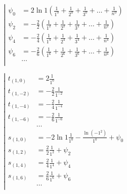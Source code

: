 \begin{equation*} \left| \begin{aligned}
\psi_0 &= 2 \ln{1}
  \left(
  \frac{1}{1^0}
+ \frac{1}{2^0}
+ \frac{1}{3^0}
+ \ldots
+ \frac{1}{n^0}
  \right) \\
%
\psi_2 &=
- \frac{2}{2}
  \left(
  \frac{1}{1^2}
+ \frac{1}{2^2}
+ \frac{1}{3^2}
+ \ldots
+ \frac{1}{n^2}
  \right) \\
%
\psi_4 &=
- \frac{2}{4}
  \left(
  \frac{1}{1^4}
+ \frac{1}{2^4}
+ \frac{1}{3^4}
+ \ldots
+ \frac{1}{n^4}
  \right) \\
%
\psi_6 &=
- \frac{2}{6}
  \left(
  \frac{1}{1^6}
+ \frac{1}{2^6}
+ \frac{1}{3^6}
+ \ldots
+ \frac{1}{n^6}
  \right) \\
%
&\ldots \\
\end{aligned} \right. \end{equation*}

\begin{equation*} \left| \begin{aligned}
t_{(1,0)} &=
  2 \frac{1}{1^0} \\
%
t_{(1,-2)} &=
- \frac{2}{2}
  \frac{1}{1^{-2}} \\
%
t_{(1,-4)} &=
- \frac{2}{4}
  \frac{1}{1^{-4}} \\
%
t_{(1,-6)} &=
- \frac{2}{6}
  \frac{1}{1^{-6}} \\
&\ldots \\
%
s_{(1,0)} &=
- 2 \ln{1}
  \frac{1}{1^0}
- \frac{\ln{(- 1^2)}}{1^0}
+ \psi_0 \\
%
s_{(1,2)} &=
  \frac{2}{2}
  \frac{1}{1^2}
+ \psi_2 \\
%
s_{(1,4)} &=
  \frac{2}{4}
  \frac{1}{1^4}
+ \psi_4 \\
%
s_{(1,6)} &=
  \frac{2}{6}
  \frac{1}{1^6}
+ \psi_6 \\
%
&\ldots \\
\end{aligned} \right. \end{equation*}


